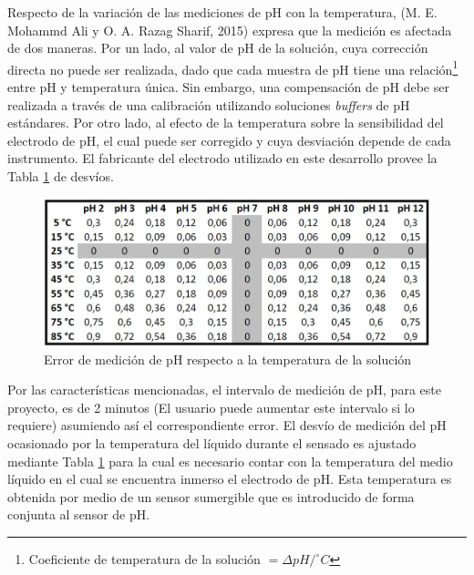             \par Respecto de la variación de las mediciones de pH con la temperatura, (M. E. Mohammd Ali y O. A. Razag Sharif, 2015) expresa que la medición es afectada de dos maneras. Por un lado, al valor de pH de la solución, cuya corrección directa no puede ser realizada, dado que cada muestra de pH tiene una relación\footnote{Coeficiente de temperatura de la solución  $ = \Delta pH/ ^{\circ}C $} entre pH y temperatura única. Sin embargo, una compensación de pH debe ser realizada a través de una calibración utilizando soluciones \textit{buffers} de pH estándares. Por otro lado, al efecto de la temperatura sobre la sensibilidad del electrodo de pH, el cual puede ser corregido y cuya desviación depende de cada instrumento. El fabricante del electrodo utilizado en este desarrollo provee la Tabla \ref{tablePhvsTemp} de desvíos. 
            
            \begin{figure}[h] 
                \centering
                \includegraphics[scale=0.6]{hardware/ErrorMedicionPH.jpg}
                \caption{Error de medición de pH respecto a la temperatura de la solución}
                \label{tablePhvsTemp}
            \end{figure}
            
            \par Por las características mencionadas, el intervalo de medición de pH, para este proyecto, es de 2 minutos (El usuario puede aumentar este intervalo si lo requiere) asumiendo así el correspondiente error. El desvío de medición del pH ocasionado por la temperatura del líquido durante el sensado es ajustado mediante Tabla \ref{tablePhvsTemp} para la cual es necesario contar con la temperatura del medio líquido en el cual se encuentra inmerso el electrodo de pH. Esta temperatura es obtenida por medio de un sensor sumergible que es introducido de forma conjunta al sensor de pH.
        
